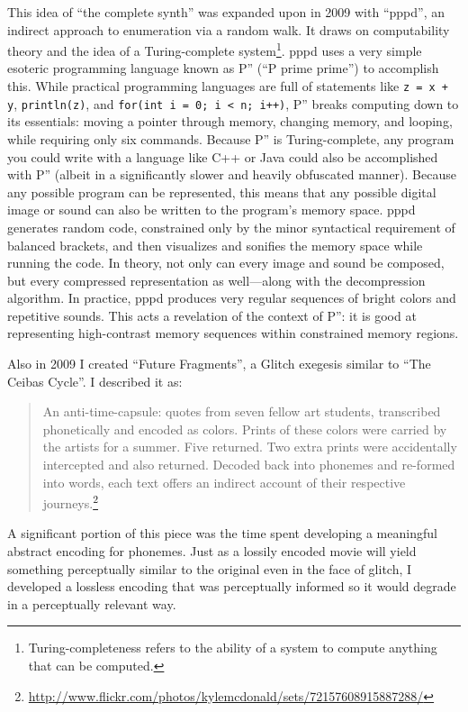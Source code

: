 \documentclass{thesis}
\begin{document}
This idea of ``the complete synth'' was expanded upon in 2009 with ``pppd''\cite{kyle_mcdonald_pppd_2009}, an indirect approach to enumeration via a random walk. It draws on computability theory\cite{boolos_computability_2002} and the idea of a Turing-complete system\footnote{Turing-completeness refers to the ability of a system to compute anything that can be computed.}. pppd uses a very simple esoteric programming language known as P'' (``P prime prime'') to accomplish this. While practical programming languages are full of statements like \verb!z = x + y!, \verb!println(z)!, and \verb!for(int i = 0; i < n; i++)!, P'' breaks computing down to its essentials: moving a pointer through memory, changing memory, and looping, while requiring only six commands. Because P'' is Turing-complete, any program you could write with a language like C++ or Java could also be accomplished with P'' (albeit in a significantly slower and heavily obfuscated manner). Because any possible program can be represented, this means that any possible digital image or sound can also be written to the program's memory space. pppd generates random code, constrained only by the minor syntactical requirement of balanced brackets, and then visualizes and sonifies the memory space while running the code. In theory, not only can every image and sound be composed, but every compressed representation as well---along with the decompression algorithm. In practice, pppd produces very regular sequences of bright colors and repetitive sounds. This acts a revelation of the context of P'': it is good at representing high-contrast memory sequences within constrained memory regions.

Also in 2009 I created ``Future Fragments'', a Glitch exegesis similar to ``The Ceibas Cycle''. I described it as:
	
	\begin{quote}
	An anti-time-capsule: quotes from seven fellow art students, transcribed phonetically and encoded as colors. Prints of these colors were carried by the artists for a summer. Five returned. Two extra prints were accidentally intercepted and also returned. Decoded back into phonemes and re-formed into words, each text offers an indirect account of their respective journeys.\footnote{\url{http://www.flickr.com/photos/kylemcdonald/sets/72157608915887288/}}
	\end{quote}

A significant portion of this piece was the time spent developing a meaningful abstract encoding for phonemes. Just as a lossily encoded movie will yield something perceptually similar to the original even in the face of glitch, I developed a lossless encoding that was perceptually informed so it would degrade in a perceptually relevant way.
\end{document}
